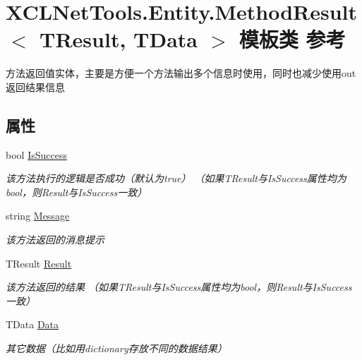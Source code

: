 \hypertarget{class_x_c_l_net_tools_1_1_entity_1_1_method_result_3_01_t_result_00_01_t_data_01_4}{\section{X\-C\-L\-Net\-Tools.\-Entity.\-Method\-Result$<$ T\-Result, T\-Data $>$ 模板类 参考}
\label{class_x_c_l_net_tools_1_1_entity_1_1_method_result_3_01_t_result_00_01_t_data_01_4}
}


方法返回值实体，主要是方便一个方法输出多个信息时使用，同时也减少使用out返回结果信息  


\subsection*{属性}
\begin{DoxyCompactItemize}
\item 
bool \hyperlink{class_x_c_l_net_tools_1_1_entity_1_1_method_result_3_01_t_result_00_01_t_data_01_4_a562911ed4e73a529dca6d2f10f774597}{Is\-Success}
\begin{DoxyCompactList}\small\item\em 该方法执行的逻辑是否成功（默认为true） （如果\-T\-Result与\-Is\-Success属性均为bool，则\-Result与\-Is\-Success一致） \end{DoxyCompactList}\item 
string \hyperlink{class_x_c_l_net_tools_1_1_entity_1_1_method_result_3_01_t_result_00_01_t_data_01_4_a42b60daad9e9c8918d166bb532715415}{Message}
\begin{DoxyCompactList}\small\item\em 该方法返回的消息提示 \end{DoxyCompactList}\item 
T\-Result \hyperlink{class_x_c_l_net_tools_1_1_entity_1_1_method_result_3_01_t_result_00_01_t_data_01_4_a5ada3fa6bfeaf5e9a531225071c9700f}{Result}
\begin{DoxyCompactList}\small\item\em 该方法返回的结果 （如果\-T\-Result与\-Is\-Success属性均为bool，则\-Result与\-Is\-Success一致） \end{DoxyCompactList}\item 
T\-Data \hyperlink{class_x_c_l_net_tools_1_1_entity_1_1_method_result_3_01_t_result_00_01_t_data_01_4_a61973d8192cd072de16f5f132c2e9ff2}{Data}
\begin{DoxyCompactList}\small\item\em 其它数据（比如用dictionary存放不同的数据结果） \end{DoxyCompactList}\end{DoxyCompactItemize}


